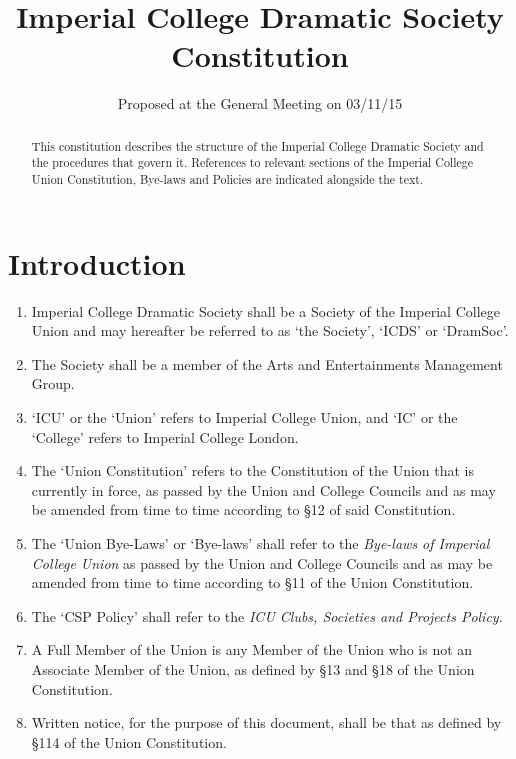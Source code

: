 \documentclass[a4paper]{tufte-handout}
\title{Imperial College Dramatic Society Constitution}
\date{Proposed at the General Meeting on 03/11/15}
\newcommand{\policyOffset}{12pt}
\newcommand{\policyCspp}[2][\policyOffset]{\marginnote[#1]{\textsc{CSP Policy \S#2}}}
\begin{document}
\maketitle

\begin{fullwidth}
\itshape

\begin{abstract}
This constitution describes the structure of the Imperial College Dramatic Society and the procedures that govern it.
References to relevant sections of the Imperial College Union Constitution, Bye-laws and Policies are indicated alongside the text.
\end{abstract}
\end{fullwidth}

\hdashrule{15cm}{1.1pt}{1.1pt}

\section{Introduction}
\begin{enumerate}
    \item Imperial College Dramatic Society shall be a Society of the Imperial College Union and may hereafter be referred to as `the Society', `ICDS' or `DramSoc'.
    \item \policyCspp{33} The Society shall be a member of the Arts and Entertainments Management Group.
    \item `ICU' or the `Union' refers to Imperial College Union, and `IC' or the `College' refers to Imperial College London.
    \item The `Union Constitution' refers to the Constitution of the Union that is currently in force, as passed by the Union and College Councils and as may be amended from time to time according to \S12 of said Constitution.
    \item The `Union Bye-Laws' or `Bye-laws' shall refer to the \textit{Bye-laws of Imperial College Union} as passed by the Union and College Councils and as may be amended from time to time according to \S11 of the Union Constitution.
    \item The `CSP Policy' shall refer to the \textit{ICU Clubs, Societies and Projects Policy}.
    \item A Full Member of the Union is any Member of the Union who is not an Associate Member of the Union, as defined by \S13 and \S18 of the Union Constitution.
    \item Written notice, for the purpose of this document, shall be that as defined by \S114 of the Union Constitution.
\end{enumerate}
\end{document}
